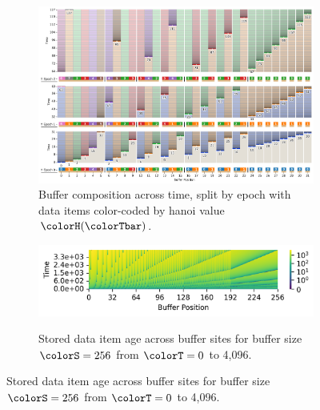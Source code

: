 \begin{figure}[htbp!]
\begin{subfigure}[b]{\linewidth}
\includegraphics[width=\linewidth]{
binder/teeplots/12/num-generations=128+reservation-mode=steady-full+surface-size=32+viz=site-reservation-by-rank-spliced-at-heatmap+ext=.png}
\vspace{-4.5ex}\caption{
  Buffer composition across time, split by epoch with data items color-coded by hanoi value $\colorH(\colorTbar)$.
}
\label{fig:hsurf-steady-implementation-schematic}
\end{subfigure}

\vspace{0.5ex}
\begin{minipage}[]{\textwidth}
 \vspace{-2pt}
  \begin{subfigure}[t]{0.65\linewidth}
    \vspace{0pt}
    \centering
  \includegraphics[width=0.88\linewidth,clip]{binder/teeplots/12/cnorm=log+num-generations=4096+surface-size=256+viz=site-ingest-depth-by-rank-heatmap+ynorm=linear+ext=.png}  %
  \end{subfigure}%
  \begin{subfigure}[t]{0.35\linewidth}
  \vspace{-2pt}
  \caption{%
    \footnotesize
    Stored data item age across buffer sites for buffer size $\colorS=256$ from $\colorT=0$ to 4,096.
  }
  \label{fig:hsurf-steady-implementation-heatmap}
\end{subfigure}
\end{minipage}


\end{figure}
